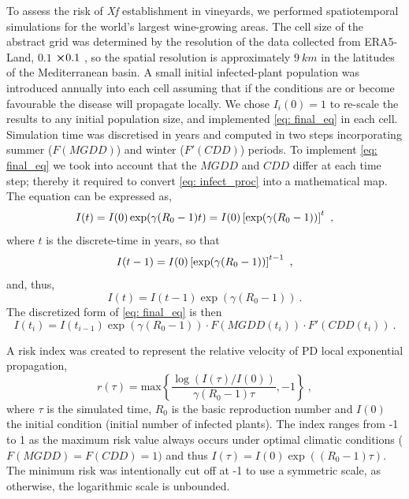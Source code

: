 To assess the risk of \textit{Xf} establishment in vineyards, we performed
spatiotemporal simulations for the world's largest wine-growing areas. The cell
size of the abstract grid was determined by the resolution of the data
collected from ERA5-Land, $0.1$ \textdegree $\cross 0.1$ \textdegree , so the
spatial resolution is approximately $\SI{9}{km}$ in the latitudes of the
Mediterranean basin. A small initial infected-plant population was introduced
annually into each cell assuming that if the conditions are or become
favourable the disease will propagate locally. We chose $I_i(0)=1$ to re-scale
the results to any initial population size, and implemented \cref{eq: final_eq}
in each cell. Simulation time was discretised in years and computed in two
steps incorporating summer ($F(MGDD)$) and winter ($F'(CDD)$) periods. To
implement \cref{eq: final_eq} we took into account that the $MGDD$ and $CDD$
differ at each time step; thereby it required to convert \cref{eq: infect_proc}
into a mathematical map. The equation can be expressed as,
\begin{equation}
    I(t)=I(0)\exp(\gamma(R_0-1)t)=I(0)\left[\exp(\gamma(R_0-1))\right]^t \ ,
\end{equation}
where $t$ is the discrete-time in years,
so that
\begin{equation}
    I(t-1)=I(0)\left[\exp(\gamma(R_0-1))\right]^{t-1} \ ,
\end{equation}
and, thus,
\begin{equation}
    I(t)=I(t-1)\exp(\gamma(R_0-1)) \ .
\end{equation}
The discretized form of \cref{eq: final_eq} is then
\begin{equation}
    I(t_i)=I(t_{i-1})\exp(\gamma(R_0-1))\cdot F(MGDD(t_i))\cdot
    F'(CDD(t_i)) \ .
    \label{eq:imapevol}
\end{equation}

A risk index was created to represent the relative velocity of PD local
exponential propagation,
\begin{equation}
    r(\tau)=\textrm{max}\left\{
    \frac{\log(I(\tau)/I(0))}{\gamma(R_0-1)\tau}, -1
    \right\} \ ,
    \label{eq:riskindex}
\end{equation}
where $\tau$ is the simulated time, $R_0$ is the basic reproduction number
and $I(0)$ the initial condition (initial number of infected plants). The index
ranges from -1 to 1 as the maximum risk value always occurs under optimal
climatic conditions ($F(MGDD)=F(CDD)=1)$ and thus
$I(\tau)=I(0)\exp((R_0-1)\tau)$. The minimum risk was intentionally cut off at
-1 to use a symmetric scale, as otherwise, the logarithmic scale is unbounded.

